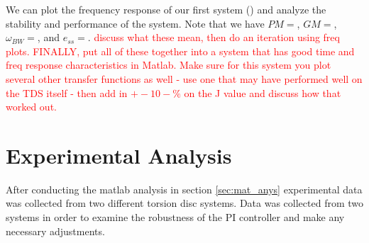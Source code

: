 \documentclass[11pt,titlepage]{article}
\begin{document}
	We can plot the frequency response of our first system () and analyze the stability and performance of the system. Note that we have 
	$PM=$, $GM=$, $\omega_{BW}=$, and $e_{ss}=$. \textcolor{red}{discuss what these mean, then do an iteration using freq plots. FINALLY, put all of these together into a system that has good time and freq response characteristics in Matlab. Make sure for this system you plot several other transfer functions as well - use one that may have performed well on the TDS itself - then add in $+-10-\%$ on the J value and discuss how that worked out.}
	 
\section{Experimental Analysis}
    After conducting the matlab analysis in section \ref{sec:mat_anys} experimental data was collected from two different torsion disc systems. Data was collected from two systems in order to examine the robustness of the PI controller and make any necessary adjustments.
\end{document}
